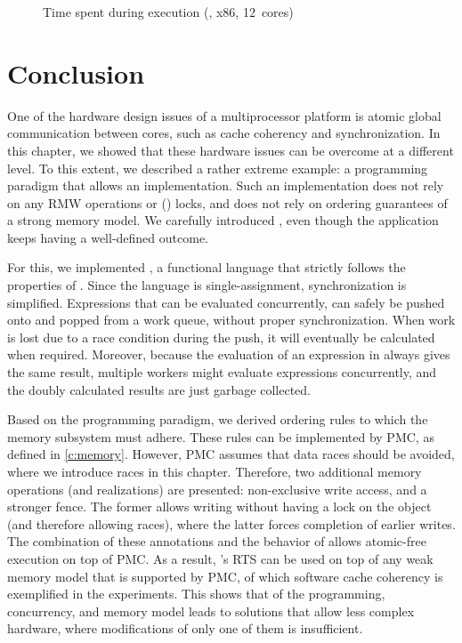 \begin{figure}%
%
\caption{Time spent during execution (\ourfp, x86, 12~cores)}%
\label{fig:concurrency:phases}%
\end{figure}


\section{Conclusion}
\label{s:concurrency:conclusion}

One of the hardware design issues of a multiprocessor platform is atomic global communication between cores, such as cache coherency and synchronization.
In this chapter, we showed that these hardware issues can be overcome at a different level.
To this extent, we described a rather extreme example: a programming paradigm that allows an \emph{} implementation.
Such an implementation does not rely on any \acl{RMW} operations or () locks, and does not rely on ordering guarantees of a strong memory model.
We carefully introduced , even though the application keeps having a well-defined outcome.

For this, we implemented \ourfp, a functional language that strictly follows the properties of \lcalc.
Since the language is single-assignment, synchronization is simplified.
Expressions that can be evaluated concurrently, can safely be pushed onto and popped from a work queue, without proper synchronization.
When work is lost due to a race condition during the push, it will eventually be calculated when required.
Moreover, because the evaluation of an expression in \lcalc always gives the same result, multiple workers might evaluate expressions concurrently, and the doubly calculated results are just garbage collected.

Based on the programming paradigm, we derived ordering rules to which the memory subsystem must adhere.
These rules can be implemented by \ac{PMC}, as defined in \cref{c:memory}.
However, \ac{PMC} assumes that data races should be avoided, where we introduce races in this chapter.
Therefore, two additional memory operations (and realizations) are presented: non-exclusive write access, and a stronger fence.
The former allows writing without having a lock on the object (and therefore allowing races), where the latter forces completion of earlier writes.
The combination of these annotations and the behavior of \lterms allows atomic-free execution on top of \ac{PMC}.
As a result, \ourfp's \ac{RTS} can be used on top of any weak memory model that is supported by \ac{PMC}, of which software cache coherency is exemplified in the experiments.
This shows that \keyinsight{\codesign*} of the programming, concurrency, and memory model leads to solutions that allow less complex hardware, where modifications of only one of them is insufficient.

